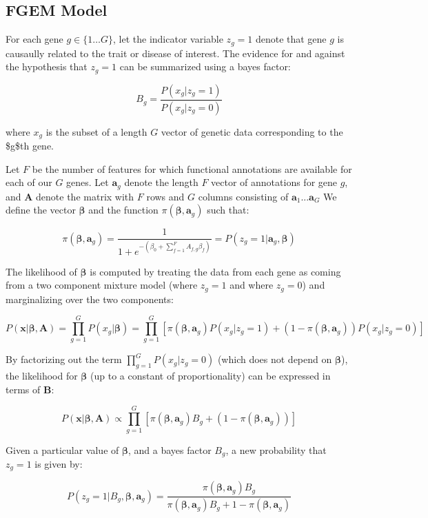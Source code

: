 \subsection{FGEM Model}\label{sec:org4e93496}

For each gene  \(g \in \{1 \dots G\}\), let the indicator variable \(z_g=1\) denote that gene \(g\) is causaully related to the trait or disease of interest.  The evidence for and against the hypothesis that \(z_g=1\) can be
summarized using a bayes factor:

$$B_g=\frac{P(x_g|z_g=1)}{P(x_g|z_g=0)}$$

where \(x_g\) is the subset of a length $G$ vector of genetic data corresponding to the \$g\$th gene.

Let \(F\) be the number of features for which functional annotations are available for each of our \(G\) genes.  Let \(\textbf{a}_g\) denote the length \(F\) vector of annotations for gene \(g\), and \(\textbf{A}\) denote the matrix with \(F\) rows and \(G\) 
columns consisting of \(\textbf{a}_1 ...  \textbf{a}_G\)
We define the vector \(\boldsymbol{\beta}\) and the function \(\pi(\boldsymbol{\beta},\textbf{a}_g)\) such that:

$$\pi(\boldsymbol{\beta},\textbf{a}_g) =  \frac{1}{1+e^{-(\beta_{0}+\sum_{f=1}^F{A_{f,g}\beta_f})}} =  P(z_g=1|\textbf{a}_g,\boldsymbol{\beta})$$

The likelihood of \(\boldsymbol{\beta}\) is computed by treating the data from each gene as coming from a two component mixture model (where \(z_g=1\) and where \(z_g=0\)) and marginalizing over the two components:

$$ P(\textbf{x}|\boldsymbol{\beta},\textbf{A})=\prod_{g=1}^{G}P(x_g|\boldsymbol{\beta})=\prod_{g=1}^{G}[\pi(\boldsymbol{\beta},\textbf{a}_g) P(x_g|z_g=1)+(1-\pi(\boldsymbol{\beta},\textbf{a}_g))P(x_g|z_g=0)]$$

By factorizing out the term \(\prod_{g=1}^{G} P(x_g|z_g=0)\) (which does not depend on $\boldsymbol{\beta}$), the likelihood for \(\boldsymbol{\beta}\) (up to a constant of proportionality) can be expressed in terms of \(\textbf{B}\):

$$P(\textbf{x}|\boldsymbol{\beta},\textbf{A}) \propto \prod_{g=1}^{G}[\pi(\boldsymbol{\beta},\textbf{a}_g)B_g+(1-\pi(\boldsymbol{\beta},\textbf{a}_g))]$$

Given a particular value of \(\boldsymbol{\beta}\), and a bayes factor \(B_g\),  a new probability that \(z_g=1\) is given by:

$$P(z_g=1 | B_g, \boldsymbol{\beta},\textbf{a}_g) = \frac{\pi(\boldsymbol{\beta},\textbf{a}_g) B_g}{\pi(\boldsymbol{\beta} , \textbf{a}_g) B_g + 1 - \pi(\boldsymbol{\beta},\textbf{a}_g)}$$


